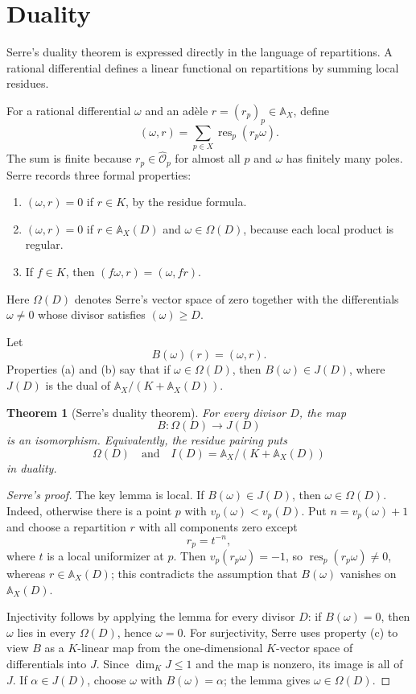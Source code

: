 \documentclass[11pt,a4paper]{article}
\newcommand{\wideO}{\widehat{\mathcal O}}
\newcommand{\AX}{\mathbb A_X}
\newcommand{\res}{\operatorname{res}}
\theoremstyle{definition}
\theoremstyle{plain}
\newtheorem{theorem}[definition]{Theorem}
\theoremstyle{remark}
\begin{document}
\section{Duality}

Serre's duality theorem is expressed directly in the language of repartitions.  A rational differential defines a linear functional on repartitions by summing local residues.

For a rational differential $\omega$ and an adèle $r=(r_p)_p\in\AX$, define
\[
  (\omega,r)=\sum_{p\in X}\res_p(r_p\omega).
\]
The sum is finite because $r_p\in\wideO_p$ for almost all $p$ and $\omega$ has finitely many poles.  Serre records three formal properties:
\begin{enumerate}[label=(\alph*)]
\item $(\omega,r)=0$ if $r\in K$, by the residue formula.
\item $(\omega,r)=0$ if $r\in\AX(D)$ and $\omega\in\Omega(D)$, because each local product is regular.
\item If $f\in K$, then $(f\omega,r)=(\omega,fr)$.
\end{enumerate}
Here $\Omega(D)$ denotes Serre's vector space of zero together with the differentials $\omega\ne0$ whose divisor satisfies $(\omega)\ge D$.

Let
\[
  B(\omega)(r)=(\omega,r).
\]
Properties (a) and (b) say that if $\omega\in\Omega(D)$, then $B(\omega)\in J(D)$, where $J(D)$ is the dual of $\AX/(K+\AX(D))$.

\begin{theorem}[Serre's duality theorem]
For every divisor $D$, the map
\[
  B\colon \Omega(D)\longrightarrow J(D)
\]
is an isomorphism.  Equivalently, the residue pairing puts
\[
  \Omega(D)
  \quad\text{and}\quad
  I(D)=\AX/(K+\AX(D))
\]
in duality.
\end{theorem}

\begin{proof}[Serre's proof]
The key lemma is local.  If $B(\omega)\in J(D)$, then $\omega\in\Omega(D)$.  Indeed, otherwise there is a point $p$ with $v_p(\omega)<v_p(D)$.  Put $n=v_p(\omega)+1$ and choose a repartition $r$ with all components zero except
\[
  r_p=t^{-n},
\]
where $t$ is a local uniformizer at $p$.  Then $v_p(r_p\omega)=-1$, so $\res_p(r_p\omega)\ne0$, whereas $r\in\AX(D)$; this contradicts the assumption that $B(\omega)$ vanishes on $\AX(D)$.

Injectivity follows by applying the lemma for every divisor $D$: if $B(\omega)=0$, then $\omega$ lies in every $\Omega(D)$, hence $\omega=0$.  For surjectivity, Serre uses property (c) to view $B$ as a $K$-linear map from the one-dimensional $K$-vector space of differentials into $J$.  Since $\dim_K J\le1$ and the map is nonzero, its image is all of $J$.  If $\alpha\in J(D)$, choose $\omega$ with $B(\omega)=\alpha$; the lemma gives $\omega\in\Omega(D)$.
\end{proof}
\end{document}
